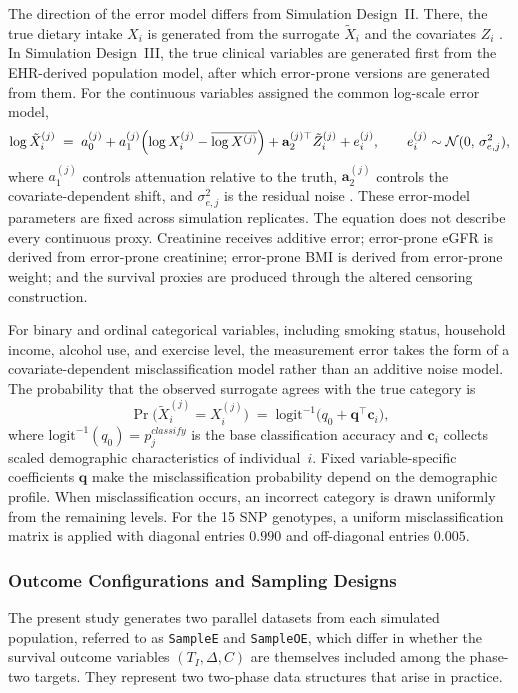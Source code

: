 The direction of the error model differs from Simulation Design~II. There, the true dietary intake $X_i$ is generated from the surrogate $\tilde{X}_i$ and the covariates $Z_i$ \citep{baldoni2021use}. In Simulation Design~III, the true clinical variables are generated first from the EHR-derived population model, after which error-prone versions are generated from them. For the continuous variables assigned the common log-scale error model,
\begin{equation}
    \log \tilde{X}_i^{(j)} \;=\; a_0^{(j)}
    + a_1^{(j)} \Bigl(\log X_i^{(j)}
      - \overline{\log X^{(j)}}\Bigr)
    + \mathbf{a}_2^{(j)\top} \tilde{Z}_i^{(j)}
    + e_i^{(j)},
    \qquad
    e_i^{(j)} \sim \mathcal{N}(0,\, \sigma^2_{e,j}),
    \label{eq:surv_me_cont}
\end{equation}
where $a_1^{(j)}$ controls attenuation relative to the truth, $\mathbf{a}_2^{(j)}$ controls the covariate-dependent shift, and $\sigma^2_{e,j}$ is the residual noise \citep{carroll2006seemingly}. These error-model parameters are fixed across simulation replicates. The equation does not describe every continuous proxy. Creatinine receives additive error; error-prone eGFR is derived from error-prone creatinine; error-prone BMI is derived from error-prone weight; and the survival proxies are produced through the altered censoring construction.

For binary and ordinal categorical variables, including smoking status, household income, alcohol use, and exercise level, the measurement error takes the form of a covariate-dependent misclassification model rather than an additive noise model. The probability that the observed surrogate agrees with the true category is
\begin{equation}
    \Pr\!\bigl(\tilde{X}_i^{(j)} = X_i^{(j)}\bigr)
    \;=\; \mathrm{logit}^{-1}\!\bigl(
        q_0 + \mathbf{q}^{\top} \mathbf{c}_i
    \bigr),
    \label{eq:surv_me_cat}
\end{equation}
where $\mathrm{logit}^{-1}(q_0) = p_{j}^{classify}$ is the base classification accuracy and $\mathbf{c}_i$ collects scaled demographic characteristics of individual~$i$. Fixed variable-specific coefficients $\mathbf{q}$ make the misclassification probability depend on the demographic profile. When misclassification occurs, an incorrect category is drawn uniformly from the remaining levels. For the 15 SNP genotypes, a uniform misclassification matrix is applied with diagonal entries $0.990$ and off-diagonal entries $0.005$.

\subsubsection{Outcome Configurations and Sampling Designs}
The present study generates two parallel datasets from each simulated population, referred to as \texttt{SampleE} and \texttt{SampleOE}, which differ in whether the survival outcome variables $(T_I, \Delta, C)$ are themselves included among the phase-two targets. They represent two two-phase data structures that arise in practice.

